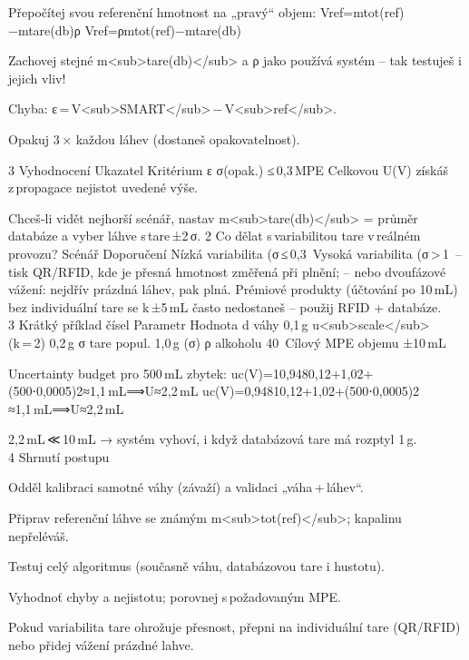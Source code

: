     Přepočítej svou referenční hmotnost na „pravý“ objem:
    Vref=mtot(ref)−mtare(db)ρ
    Vref​=ρmtot(ref)​−mtare(db)​​

    Zachovej stejné m<sub>tare(db)</sub> a ρ jako používá systém – tak testuješ i jejich vliv!

    Chyba: ε = V<sub>SMART</sub> − V<sub>ref</sub>.

    Opakuj 3 × každou láhev (dostaneš opakovatelnost).

3  Vyhodnocení
Ukazatel	Kritérium
	ε
σ(opak.) ≤ 0,3 MPE	
Celkovou U(V) získáš z propagace nejistot uvedené výše.	

Chceš‑li vidět nejhorší scénář, nastav m<sub>tare(db)</sub> = průměr databáze a vyber láhve s tare ±2 σ.
2  Co dělat s variabilitou tare v reálném provozu?
Scénář	Doporučení
Nízká variabilita (σ ≤ 0,3 %
Vysoká variabilita (σ > 1 %
– tisk QR/RFID, kde je přesná hmotnost změřená při plnění;
– nebo dvoufázové vážení: nejdřív prázdná láhev, pak plná.
Prémiové produkty (účtování po 10 mL)	bez individuální tare se k ±5 mL často nedostaneš – použij RFID + databáze.
3  Krátký příklad čísel
Parametr	Hodnota
d váhy	0,1 g
u<sub>scale</sub> (k = 2)	0,2 g
σ tare popul.	1,0 g (σ)
ρ alkoholu 40 %
Cílový MPE objemu	±10 mL

Uncertainty budget pro 500 mL zbytek:
uc(V)=10,9480,12+1,02+(500⋅0,0005)2≈1,1 mL⟹U≈2,2 mL
uc​(V)=0,9481​0,12+1,02+(500⋅0,0005)2
​≈1,1 mL⟹U≈2,2 mL

2,2 mL ≪ 10 mL → systém vyhoví, i když databázová tare má rozptyl 1 g.
4  Shrnutí postupu

    Odděl kalibraci samotné váhy (závaží) a validaci „váha + láhev“.

    Připrav referenční láhve se známým m<sub>tot(ref)</sub>; kapalinu nepřeléváš.

    Testuj celý algoritmus (současně váhu, databázovou tare i hustotu).

    Vyhodnoť chyby a nejistotu; porovnej s požadovaným MPE.

    Pokud variabilita tare ohrožuje přesnost, přepni na individuální tare (QR/RFID) nebo přidej vážení prázdné lahve.

